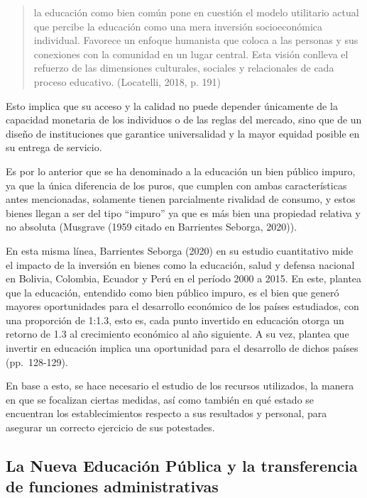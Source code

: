 \documentclass[
  12pt,
  letterpaper,
]{article}
\begin{document}
\begin{quote}
la educación como bien común pone en cuestión el modelo utilitario actual que percibe la educación como una mera inversión socioeconómica individual.
Favorece un enfoque humanista que coloca a las personas y sus conexiones con la comunidad en un lugar central.
Esta visión conlleva el refuerzo de las dimensiones culturales, sociales y relacionales de cada proceso educativo.
(Locatelli, 2018, p. 191)
\end{quote}

Esto implica que su acceso y la calidad no puede depender únicamente de la capacidad monetaria de los individuos o de las reglas del mercado, sino que de un diseño de instituciones que garantice universalidad y la mayor equidad posible en su entrega de servicio.

Es por lo anterior que se ha denominado a la educación un bien público impuro, ya que la única diferencia de los puros, que cumplen con ambas características antes mencionadas, solamente tienen parcialmente rivalidad de consumo, y estos bienes llegan a ser del tipo ``impuro'' ya que es más bien una propiedad relativa y no absoluta (Musgrave (1959 citado en Barrientes Seborga, 2020)).

En esta misma línea, Barrientes Seborga (2020) en su estudio cuantitativo mide el impacto de la inversión en bienes como la educación, salud y defensa nacional en Bolivia, Colombia, Ecuador y Perú en el período 2000 a 2015.
En este, plantea que la educación, entendido como bien público impuro, es el bien que generó mayores oportunidades para el desarrollo económico de los países estudiados, con una proporción de 1:1.3, esto es, cada punto invertido en educación otorga un retorno de 1.3 al crecimiento económico al año siguiente.
A su vez, plantea que invertir en educación implica una oportunidad para el desarrollo de dichos países (pp.~128-129).

En base a esto, se hace necesario el estudio de los recursos utilizados, la manera en que se focalizan ciertas medidas, así como también en qué estado se encuentran los establecimientos respecto a sus resultados y personal, para asegurar un correcto ejercicio de sus potestades.

\subsection{La Nueva Educación Pública y la transferencia de funciones administrativas}\label{la-nueva-educaciuxf3n-puxfablica-y-la-transferencia-de-funciones-administrativas}
\end{document}
